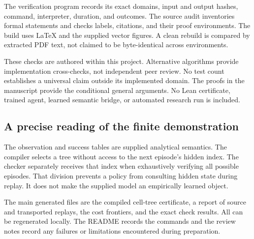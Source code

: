 \documentclass[11pt,letterpaper]{article}
\theoremstyle{plain}
\theoremstyle{definition}
\begin{document}
The verification program records its exact domains, input and output hashes, command, interpreter, duration, and outcomes. The source audit inventories formal statements and checks labels, citations, and their proof environments. The build uses LaTeX and the supplied vector figures. A clean rebuild is compared by extracted PDF text, not claimed to be byte-identical across environments.

These checks are authored within this project. Alternative algorithms provide implementation cross-checks, not independent peer review. No test count establishes a universal claim outside its implemented domain. The proofs in the manuscript provide the conditional general arguments. No Lean certificate, trained agent, learned semantic bridge, or automated research run is included.

\subsection{A precise reading of the finite demonstration}
The observation and success tables are supplied analytical semantics. The compiler selects a tree without access to the next episode's hidden index. The checker separately receives that index when exhaustively verifying all possible episodes. That division prevents a policy from consulting hidden state during replay. It does not make the supplied model an empirically learned object.

The main generated files are the compiled cell-tree certificate, a report of source and transported replays, the cost frontiers, and the exact check results. All can be regenerated locally. The README records the commands and the review notes record any failures or limitations encountered during preparation.
\end{document}
